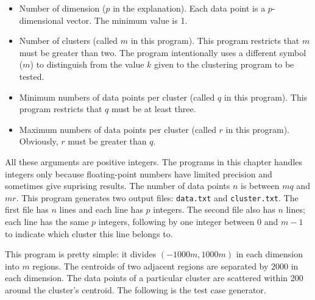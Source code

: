 \begin{itemize}
\item Number of dimension ($p$ in the explanation).  Each data point
  is a $p$-dimensional vector. The minimum value is 1.

\item Number of clusters (called $m$ in this program).  This program
  restricts that $m$ must be greater than two.  The program
  intentionally uses a different symbol ($m$) to distinguish from the
  value $k$ given to the clustering program to be tested.

\item Minimum numbers of data points per cluster (called $q$ in this
  program).  This program restricts that $q$ must be at least three.

\item Maximum numbers of data points per cluster (called $r$ in this
  program). Obviously, $r$ must be greater than $q$.

\end{itemize}  

All these arguments are positive integers.  The programs in this
chapter handles integers only because floating-point numbers have
limited precision and sometimes give suprising results.  The number of
data points $n$ is between $m q$ and $m r$.
  This program
generates two output files: {\tt data.txt} and {\tt cluster.txt}.  The
first file has $n$ lines and each line has $p$ integers.  The second
file also has $n$ lines; each line has the same $p$ integers,
following by one integer between $0$ and $m - 1$ to indicate which
cluster this line belongs to.

This program is pretty simple: it divides $(-1000m, 1000m)$ in each
dimension into $m$ regions. The centroids of two adjacent regions are
separated by 2000 in each dimension.  The data points of a particular
cluster are scattered within 200 around the cluster's centroid.  The
following is the test case generator.

\resetlinenumber[1]
\linenumbers
\begin{tt}
  
\end{tt}
\nolinenumbers

\resetlinenumber[1]
\linenumbers
\begin{tt}
  
\end{tt}
\nolinenumbers

